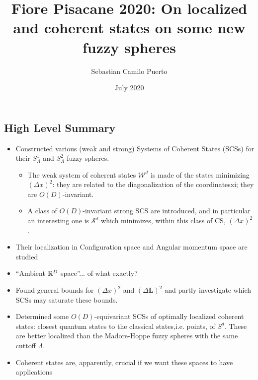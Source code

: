 \documentclass{article}
\title{Fiore Pisacane 2020: On localized and coherent states on some new fuzzy spheres}
\author{Sebastian Camilo Puerto}
\date{July 2020}
\begin{document}
\maketitle

\tableofcontents


\subsection{High Level Summary}

    \begin{itemize}

    \item Constructed various (weak and strong) Systems of Coherent States (SCSs) for their $S^1_\Lambda$ and $S^2_\Lambda$ fuzzy spheres.
    
        \begin{itemize}
            
        \item The weak system of coherent states $\mathcal W^d$ is made of the states minimizing $(\Delta x)^2$:  they are related to the diagonalization of the coordinatesxi; they are $O(D)$-invariant.
    
        \item A class of $O(D)$-invariant strong SCS are introduced, and in particular an interesting one is $\mathcal S^d$ which minimizes, within this class of CS, $(\Delta x)^2$.
            
        \end{itemize}
    
    \item Their localization in Configuration space and Angular momentum space are studied
    
    \item ``Ambient $\mathbb{R}^D$ space''... of what exactly?
    
    \item Found general bounds for $(\Delta x)^2$ and $(\Delta \mathbf{L})^2$ and partly investigate which SCSs may saturate these bounds.
    
    \item Determined some $O(D)$-equivariant SCSs of optimally localized coherent states: closest quantum states to the classical states,i.e. points, of $S^d$. These are better localized than the Madore-Hoppe fuzzy spheres with the same cuttoff $\Lambda$.
    
    \item Coherent states are, apparently, crucial if we want these spaces to have applications
    
   
    
    \end{itemize}
\end{document}
